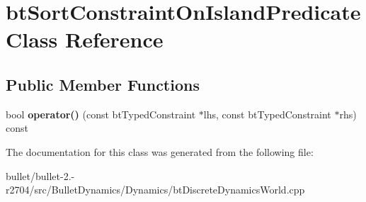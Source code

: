 \hypertarget{classbt_sort_constraint_on_island_predicate}{\section{bt\+Sort\+Constraint\+On\+Island\+Predicate Class Reference}
\label{classbt_sort_constraint_on_island_predicate}
}
\subsection*{Public Member Functions}
\begin{DoxyCompactItemize}
\item 
\hypertarget{classbt_sort_constraint_on_island_predicate_a0c6cf8a80a03fdff120a97b1f384ee30}{bool {\bfseries operator()} (const bt\+Typed\+Constraint $\ast$lhs, const bt\+Typed\+Constraint $\ast$rhs) const }\label{classbt_sort_constraint_on_island_predicate_a0c6cf8a80a03fdff120a97b1f384ee30}

\end{DoxyCompactItemize}


The documentation for this class was generated from the following file\+:\begin{DoxyCompactItemize}
\item 
bullet/bullet-\/2.-\/r2704/src/\+Bullet\+Dynamics/\+Dynamics/bt\+Discrete\+Dynamics\+World.\+cpp\end{DoxyCompactItemize}
